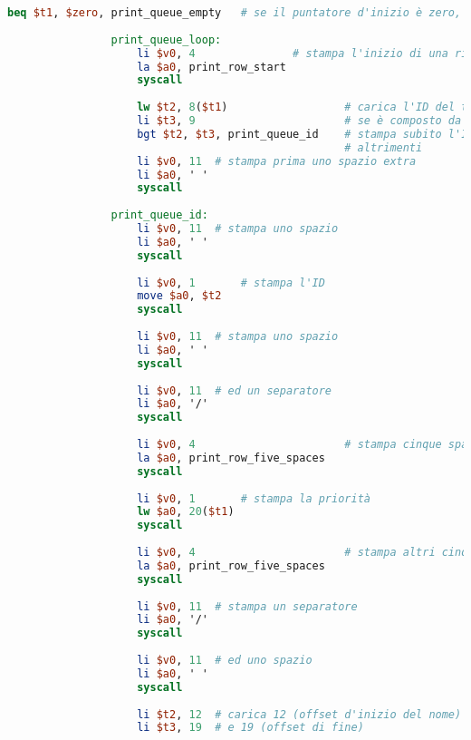 \begin{center}
\begin{lstlisting}[language=mips, gobble=14, stepnumber=1]
                    beq $t1, $zero, print_queue_empty   # se il puntatore d'inizio è zero, salta alla stampa della coda vuota
                    
                print_queue_loop:
                    li $v0, 4               # stampa l'inizio di una riga
                    la $a0, print_row_start
                    syscall
                    
                    lw $t2, 8($t1)                  # carica l'ID del task attuale
                    li $t3, 9                       # se è composto da due cifre
                    bgt $t2, $t3, print_queue_id    # stampa subito l'ID
                                                    # altrimenti
                    li $v0, 11  # stampa prima uno spazio extra
                    li $a0, ' '
                    syscall
                    
                print_queue_id:
                    li $v0, 11  # stampa uno spazio
                    li $a0, ' '
                    syscall
                
                    li $v0, 1       # stampa l'ID
                    move $a0, $t2
                    syscall
                    
                    li $v0, 11  # stampa uno spazio
                    li $a0, ' '
                    syscall
                    
                    li $v0, 11  # ed un separatore
                    li $a0, '/'
                    syscall
                    
                    li $v0, 4                       # stampa cinque spazi
                    la $a0, print_row_five_spaces
                    syscall
                    
                    li $v0, 1       # stampa la priorità
                    lw $a0, 20($t1)
                    syscall
                    
                    li $v0, 4                       # stampa altri cinque spazi
                    la $a0, print_row_five_spaces
                    syscall
                    
                    li $v0, 11  # stampa un separatore
                    li $a0, '/'
                    syscall
                    
                    li $v0, 11  # ed uno spazio
                    li $a0, ' '
                    syscall
                    
                    li $t2, 12  # carica 12 (offset d'inizio del nome)
                    li $t3, 19  # e 19 (offset di fine)
                    

\end{lstlisting}
\end{center}
